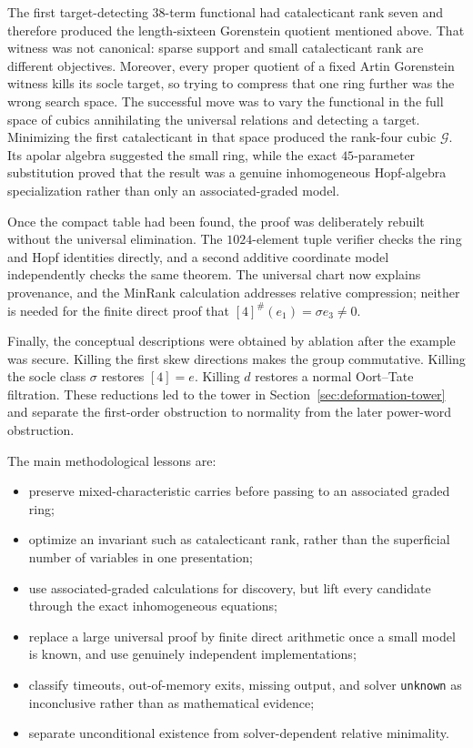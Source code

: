 \documentclass[11pt]{article}
\theoremstyle{remark}
\begin{document}
The first target-detecting \(38\)-term functional had catalecticant rank
seven and therefore produced the length-sixteen Gorenstein quotient
mentioned above.  That witness was not canonical: sparse support and small
catalecticant rank are different objectives.  Moreover, every proper
quotient of a fixed Artin Gorenstein witness kills its socle target, so
trying to compress that one ring further was the wrong search space.  The
successful move was to vary the functional in the full space of cubics
annihilating the universal relations and detecting a target.  Minimizing
the first catalecticant in that space produced the rank-four cubic
\(\mathcal G\).  Its apolar algebra suggested the small ring, while the
exact \(45\)-parameter substitution proved that the result was a genuine
inhomogeneous Hopf-algebra specialization rather than only an
associated-graded model.

Once the compact table had been found, the proof was deliberately rebuilt
without the universal elimination.  The \(1024\)-element tuple verifier
checks the ring and Hopf identities directly, and a second additive
coordinate model independently checks the same theorem.  The universal
chart now explains provenance, and the MinRank calculation addresses
relative compression; neither is needed for the finite direct proof that
\([4]^\#(e_1)=\sigma e_3\ne0\).

Finally, the conceptual descriptions were obtained by ablation after the
example was secure.  Killing the first skew directions makes the group
commutative.  Killing the socle class \(\sigma\) restores \([4]=e\).
Killing \(d\) restores a normal Oort--Tate filtration.  These reductions led
to the tower in Section~\ref{sec:deformation-tower} and separate the
first-order obstruction to normality from the later power-word obstruction.

The main methodological lessons are:
\begin{itemize}
\item preserve mixed-characteristic carries before passing to an associated
  graded ring;
\item optimize an invariant such as catalecticant rank, rather than the
  superficial number of variables in one presentation;
\item use associated-graded calculations for discovery, but lift every
  candidate through the exact inhomogeneous equations;
\item replace a large universal proof by finite direct arithmetic once a
  small model is known, and use genuinely independent implementations;
\item classify timeouts, out-of-memory exits, missing output, and solver
  \texttt{unknown} as inconclusive rather than as mathematical evidence;
\item separate unconditional existence from solver-dependent relative
  minimality.
\end{itemize}
\end{document}
